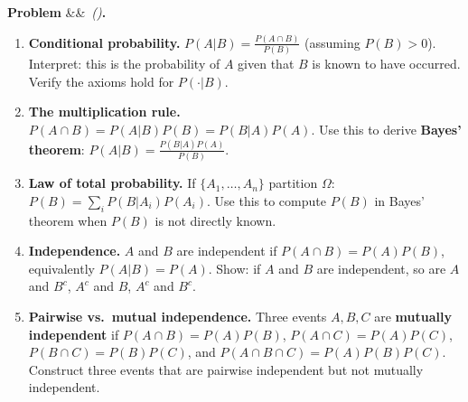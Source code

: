 \documentclass[12pt, a4paper]{article}
\newcounter{problem}
\newenvironment{problem}[1][]{%
  \refstepcounter{problem}%
  \par\vspace{6pt}%
  \noindent\textbf{\color{MidBlue}Problem \theproblem}%
  \ifx&#1&\else\ \textit{(#1)}\fi\textbf{.}\enskip
}{\par\vspace{4pt}}
\begin{document}
\begin{problem}
\label{prob:conditional}
\begin{enumerate}[label=(\alph*),topsep=2pt]
  \item \textbf{Conditional probability.} $P(A|B) = \frac{P(A\cap B)}{P(B)}$ (assuming $P(B)>0$). Interpret: this is the probability of $A$ given that $B$ is known to have occurred. Verify the axioms hold for $P(\cdot|B)$.
  \item \textbf{The multiplication rule.} $P(A\cap B)=P(A|B)P(B)=P(B|A)P(A)$. Use this to derive \textbf{Bayes' theorem}:
  $P(A|B) = \frac{P(B|A)P(A)}{P(B)}$.
  \item \textbf{Law of total probability.} If $\{A_1,\ldots,A_n\}$ partition $\Omega$: $P(B) = \sum_i P(B|A_i)P(A_i)$. Use this to compute $P(B)$ in Bayes' theorem when $P(B)$ is not directly known.
  \item \textbf{Independence.} $A$ and $B$ are independent if $P(A\cap B)=P(A)P(B)$, equivalently $P(A|B)=P(A)$. Show: if $A$ and $B$ are independent, so are $A$ and $B^c$, $A^c$ and $B$, $A^c$ and $B^c$.
  \item \textbf{Pairwise vs.\ mutual independence.} Three events $A,B,C$ are \textbf{mutually independent} if $P(A\cap B)=P(A)P(B)$, $P(A\cap C)=P(A)P(C)$, $P(B\cap C)=P(B)P(C)$, and $P(A\cap B\cap C)=P(A)P(B)P(C)$. Construct three events that are pairwise independent but not mutually independent.
\end{enumerate}
\end{problem}
\end{document}
